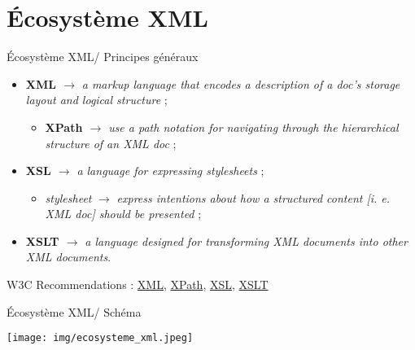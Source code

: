 \documentclass{beamer}
\begin{document}
  \section{Écosystème XML}
  \begin{frame}{Écosystème XML/ Principes généraux}
  \Large
  \begin{itemize}
      \item \textbf{XML $\rightarrow$} \textit{a markup language that encodes a description of a doc's storage layout and logical structure} ; %
      \begin{itemize}
          \item \textbf{XPath $\rightarrow$} \textit{use a path notation for navigating through the hierarchical structure of an XML doc} ;
      \end{itemize}
      \bigskip
      \item \textbf{XSL $\rightarrow$} \textit{a language for expressing stylesheets} ;
      \begin{itemize}
          \item \textit{stylesheet} $\rightarrow$ \textit{express intentions about how a structured content [i. e. XML doc] should be presented} ;
      \end{itemize}
      \bigskip
      \item \textbf{XSLT $\rightarrow$} \textit{a language designed for transforming XML documents into other XML documents}.
  \end{itemize}
   
   \footnotesize W3C Recommendations : \href{https://www.w3.org/TR/xml11/}{XML}, \href{https://www.w3.org/TR/xpath-31/}{XPath}, \href{https://www.w3.org/TR/xsl/}{XSL}, \href{https://www.w3.org/TR/xslt-30/}{XSLT}
   
  \end{frame}
  
  \begin{frame}{Écosystème XML/ Schéma}
      \begin{center}
          \texttt{[image: img/ecosysteme\_xml.jpeg]}
      \end{center}
  \end{frame}
  
\end{document}
